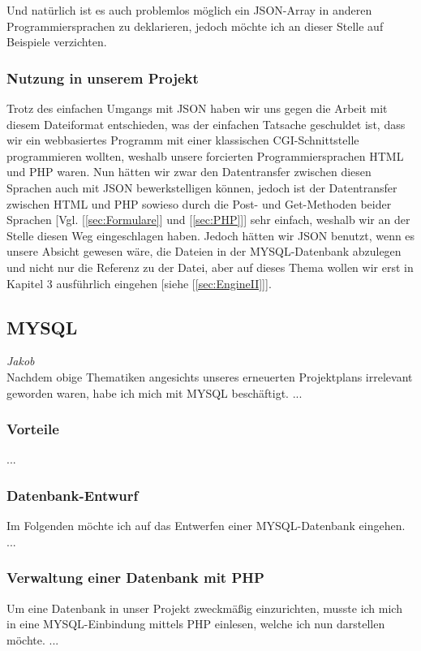 \documentclass[12pt,a4paper,bibliography=totocnumbered,listof=totocnumbered]{scrartcl}
\begin{document}
Und natürlich ist es auch problemlos möglich ein JSON-Array in anderen Programmiersprachen zu deklarieren, jedoch möchte ich an dieser Stelle auf Beispiele verzichten.

\subsubsection{Nutzung in unserem Projekt}
Trotz des einfachen Umgangs mit JSON haben wir uns gegen die Arbeit mit diesem Dateiformat entschieden, was der einfachen Tatsache geschuldet ist, dass wir ein webbasiertes Programm mit einer klassischen CGI-Schnittstelle programmieren wollten, weshalb unsere forcierten Programmiersprachen HTML und PHP waren.
Nun hätten wir zwar den Datentransfer zwischen diesen Sprachen auch mit JSON bewerkstelligen können, jedoch ist der Datentransfer zwischen HTML und PHP sowieso durch die Post- und Get-Methoden beider Sprachen [Vgl. [\ref{sec:Formulare}] und [\ref{sec:PHP}]] sehr einfach, weshalb wir an der Stelle diesen Weg eingeschlagen haben.
Jedoch hätten wir JSON benutzt, wenn es unsere Absicht gewesen wäre, die Dateien in der MYSQL-Datenbank abzulegen und nicht nur die Referenz zu der Datei, aber auf dieses Thema wollen wir erst in Kapitel 3 ausführlich eingehen [siehe [\ref{sec:EngineII}]].
\subsection{MYSQL}
\label{sec:MYSQL}
\emph{Jakob}\\
Nachdem obige Thematiken angesichts unseres erneuerten Projektplans irrelevant geworden waren, habe ich mich 
mit MYSQL beschäftigt.
...

\subsubsection{Vorteile}
...

\subsubsection{Datenbank-Entwurf}
Im Folgenden möchte ich auf das Entwerfen einer MYSQL-Datenbank eingehen.
...

\subsubsection{Verwaltung einer Datenbank mit PHP}
Um eine Datenbank in unser Projekt zweckmäßig einzurichten, musste ich mich in eine MYSQL-Einbindung mittels PHP einlesen, welche ich nun darstellen möchte.
...
\end{document}
